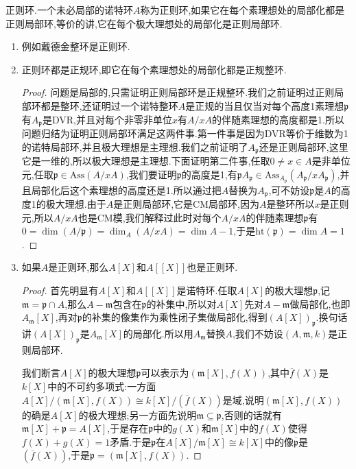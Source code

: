 正则环.一个未必局部的诺特环$A$称为正则环,如果它在每个素理想处的局部化都是正则局部环,等价的讲,它在每个极大理想处的局部化是正则局部环.
\begin{enumerate}
	\item 例如戴德金整环是正则环.
	\item 正则环都是正规环,即它在每个素理想处的局部化都是正规整环.
	\begin{proof}
		
		问题是局部的,只需证明正则局部环是正规整环.我们之前证明过正则局部环都是整环,还证明过一个诺特整环$A$是正规的当且仅当对每个高度1素理想$\mathfrak{p}$有$A_{\mathfrak{p}}$是DVR,并且对每个非零非单位$x$有$A/xA$的伴随素理想的高度都是1.所以问题归结为证明正则局部环满足这两件事.第一件事是因为DVR等价于维数为1的诺特局部环,并且极大理想是主理想.我们之前证明了$A_{\mathfrak{p}}$还是正则局部环,这里它是一维的,所以极大理想是主理想.下面证明第二件事,任取$0\not=x\in A$是非单位元,任取$\mathfrak{p}\in\mathrm{Ass}(A/xA)$,我们要证明$\mathfrak{p}$的高度是1,有$\mathfrak{p}A_{\mathfrak{p}}\in\mathrm{Ass}_{A_{\mathfrak{p}}}(A_{\mathfrak{p}}/xA_{\mathfrak{p}})$,并且局部化后这个素理想的高度还是1.所以通过把$A$替换为$A_{\mathfrak{p}}$,可不妨设$\mathfrak{p}$是$A$的高度1的极大理想.由于$A$是正则局部环,它是CM局部环,因为$A$是整环所以$x$是正则元,所以$A/xA$也是CM模,我们解释过此时对每个$A/xA$的伴随素理想$\mathfrak{p}$有$0=\dim(A/\mathfrak{p})=\dim_A(A/xA)=\dim A-1$,于是$\mathrm{ht}(\mathfrak{p})=\dim A=1$.
	\end{proof}
    \item 如果$A$是正则环,那么$A[X]$和$A[[X]]$也是正则环.
    \begin{proof}
    	
    	首先明显有$A[X]$和$A[[X]]$是诺特环.任取$A[X]$的极大理想$\mathfrak{p}$,记$\mathfrak{m}=\mathfrak{p}\cap A$,那么$A-\mathfrak{m}$包含在$\mathfrak{p}$的补集中,所以对$A[X]$先对$A-\mathfrak{m}$做局部化,也即$A_{\mathfrak{m}}[X]$,再对$\mathfrak{p}$的补集的像集作为乘性闭子集做局部化,得到$(A[X])_{\mathfrak{p}}$.换句话讲$(A[X])_{\mathfrak{p}}$是$A_{\mathfrak{m}}[X]$的局部化.所以用$A_{\mathfrak{m}}$替换$A$,我们不妨设$(A,\mathfrak{m},k)$是正则局部环.
    	
    	\qquad
    	
    	我们断言$A[X]$的极大理想$\mathfrak{p}$可以表示为$(\mathfrak{m}[X],f(X))$,其中$\overline{f}(X)$是$k[X]$中的不可约多项式:一方面$A[X]/(\mathfrak{m}[X],f(X))\cong k[X]/(\overline{f}(X))$是域,说明$(\mathfrak{m}[X],f(X))$的确是$A[X]$的极大理想;另一方面先说明$\mathfrak{m}\subseteq\mathfrak{p}$,否则的话就有$\mathfrak{m}[X]+\mathfrak{p}=A[X]$,于是存在$\mathfrak{p}$中的$g(X)$和$\mathfrak{m}[X]$中的$f(X)$使得$f(X)+g(X)=1$矛盾.于是$\mathfrak{p}$在$A[X]/\mathfrak{m}[X]\cong k[X]$中的像$\overline{\mathfrak{p}}$是$(\overline{f}(X))$,于是$\mathfrak{p}=(\mathfrak{m}[X],f(X))$.
    	

\end{proof}
\end{enumerate}
